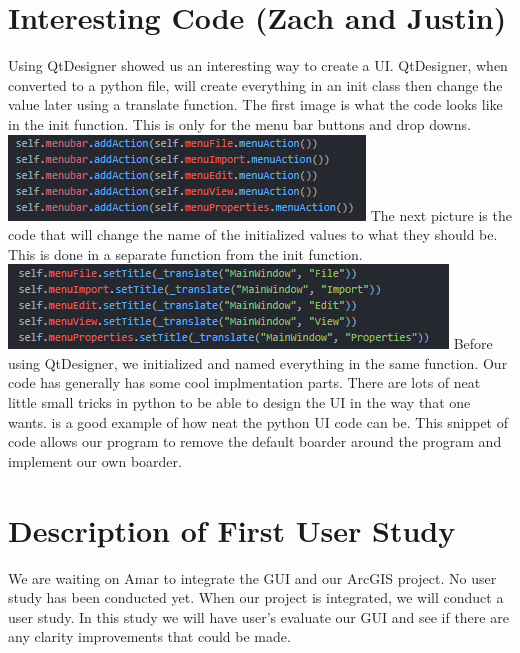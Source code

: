 \documentclass[onecolumn, draftclsnofoot,10pt, compsoc]{IEEEtran}
\begin{document}
\section{Interesting Code (Zach and Justin)}
Using QtDesigner showed us an interesting way to create a UI. QtDesigner, when converted to a python file, will create everything in an init class then change the value later using a translate function. The first image is what the code looks like in the init function. This is only for the menu bar buttons and drop downs.
\newline \newline
\includegraphics[scale= 1]{intersting-code-1.PNG}
\newline
The next picture is the code that will change the name of the initialized values to what they should be. This is done in a separate function from the init function.
\newline \newline
\includegraphics[scale= 1]{intersting-code-2.PNG}
\newline
Before using QtDesigner, we initialized and named everything in the same function.
Our code has generally has some cool implmentation parts. There are lots of neat little small tricks in python to be able to design the UI in the way that one wants.  is a good example of how neat the python UI code can be. This snippet of code allows our program to remove the default boarder around the program and implement our own boarder.


\section{Description of First User Study}
We are waiting on Amar to integrate the GUI and our ArcGIS project. No user study has been conducted yet.
When our project is integrated, we will conduct a user study. In this study we will have user's evaluate our GUI and see if there are any clarity improvements that could be made. 

\renewcommand\refname{Bibliography}

\pagebreak
\nocite{*}%



\end{document}
